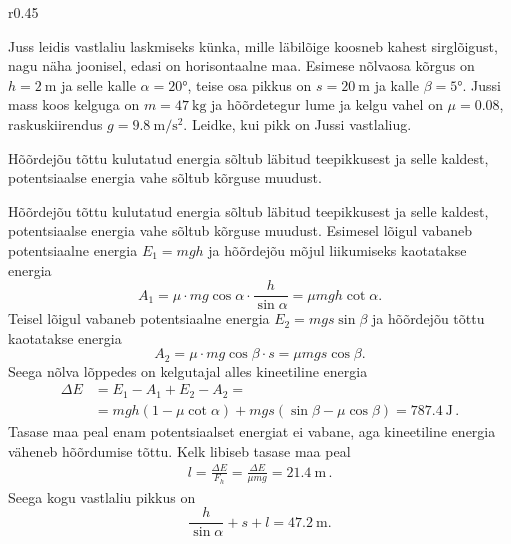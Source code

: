 
\begin{wrapfigure}[5]{r}{0.45\linewidth}
	\vspace{-5pt}
\end{wrapfigure}

Juss leidis vastlaliu laskmiseks künka, mille läbilõige koosneb kahest sirglõigust, nagu näha joonisel, edasi on horisontaalne maa. Esimese nõlvaosa kõrgus on \(h=\SI{2}{\meter}\) ja selle kalle \(\alpha=\ang{20}\), teise osa pikkus on \(s=\SI{20}{\meter}\) ja kalle \(\beta=\ang{5}\). Jussi mass koos kelguga on \(m=\SI{47}{\kilogram}\) ja hõõrdetegur lume ja kelgu vahel on \(\mu=\num{0.08}\), raskuskiirendus \(g=\SI{9.8}{\meter\per\second\squared}\). Leidke, kui pikk on Jussi vastlaliug.

\hint
Hõõrdejõu tõttu kulutatud energia sõltub läbitud teepikkusest ja selle kaldest, potentsiaalse energia vahe sõltub kõrguse muudust.

\solu
Hõõrdejõu tõttu kulutatud energia sõltub läbitud teepikkusest ja selle kaldest, potentsiaalse energia vahe sõltub kõrguse muudust. Esimesel lõigul vabaneb potentsiaalne energia \(E_1 = mgh\) ja hõõrdejõu mõjul liikumiseks kaotatakse energia
\[
A_1 = \mu \cdot mg\cos\alpha \cdot \frac{h}{\sin\alpha} = \mu mgh \cot\alpha.
\]
Teisel lõigul vabaneb potentsiaalne energia \(E_2 = mgs \sin\beta\) ja hõõrdejõu tõttu kaotatakse energia
\[
A_2 = \mu \cdot mg \cos \beta \cdot s = \mu mgs \cos \beta.
\]
Seega nõlva lõppedes on kelgutajal alles kineetiline energia
\begin{align*}
\Delta E &= E_1 - A_1 + E_2 - A_2 = \\
&= mgh(1-\mu\cot\alpha) + mgs(\sin\beta - \mu\cos\beta) = \SI{787.4}{\joule} \, .
\end{align*}
Tasase maa peal enam potentsiaalset energiat ei vabane, aga kineetiline energia väheneb hõõrdumise tõttu. Kelk libiseb tasase maa peal
\begin{align*}
l = \frac{\Delta E}{F_h} = \frac{\Delta E}{\mu mg} = \SI{21.4}{\meter} \, .
\end{align*}
Seega kogu vastlaliu pikkus on
\[
\frac{h}{\sin\alpha} + s + l = \SI{47.2}{\meter}.
\]

